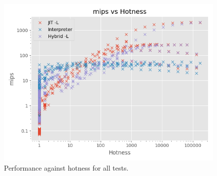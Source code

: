 \begin{figure}[h]
    \centering
    \includegraphics[scale=0.75]{output/graphs/scatter/emulators/hotness.png}
    \caption{Performance against hotness for all tests.}
    \label{figure:hotness}
\end{figure}







